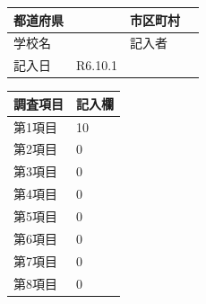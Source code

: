 \documentclass[UTF8,10pt,a4paper,fontset=fandol]{ctexart}
\newcommand{\fieldvalue}[1]{#1}
\newcommand{\handwritten}[1]{#1}
\begin{document}
\begin{tabularx}{\textwidth}{|p{}|X|p{}|X|}
\hline
都道府県 & & 市区町村 & \\
\hline
学校名 & & 記入者 & \\
\hline
記入日 &
\fieldvalue{\handwritten{R6.10.1}} &
 & \\
\hline
\end{tabularx}

\vspace{1em}

\noindent
\begin{tabularx}{\textwidth}{|p{}|X|}
\hline
\multicolumn{1}{|c|}{調査項目} & \multicolumn{1}{c|}{記入欄} \\
\hline
第1項目 &
\fieldvalue{\handwritten{10}} \\
\hline
第2項目 &
\fieldvalue{\handwritten{0}} \\
\hline
第3項目 &
\fieldvalue{\handwritten{0}} \\
\hline
第4項目 &
\fieldvalue{\handwritten{0}} \\
\hline
第5項目 &
\fieldvalue{\handwritten{0}} \\
\hline
第6項目 &
\fieldvalue{\handwritten{0}} \\
\hline
第7項目 &
\fieldvalue{\handwritten{0}} \\
\hline
第8項目 &
\fieldvalue{\handwritten{0}} \\
\hline

\end{tabularx}
\end{document}
